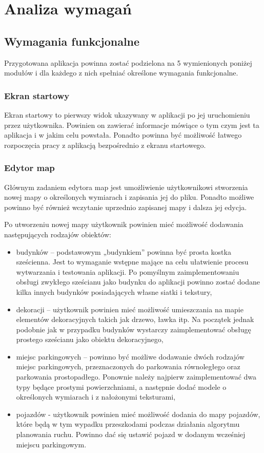 \documentclass[a4paper,11pt,twoside]{report}
\theoremstyle{definition}
\begin{document}
\chapter{Analiza wymagań}

\section{Wymagania funkcjonalne}

Przygotowana aplikacja powinna zostać podzielona na 5 wymienionych poniżej modułów i dla każdego z nich spełniać określone wymagania funkcjonalne.

\subsection{Ekran startowy}

Ekran startowy to pierwszy widok ukazywany w aplikacji po jej uruchomieniu przez użytkownika. Powinien on zawierać informacje mówiące o tym czym jest ta aplikacja i w jakim celu powstała. Ponadto powinna być możliwość łatwego rozpoczęcia pracy z aplikacją bezpośrednio z ekranu startowego.

\subsection{Edytor map}

Głównym zadaniem edytora map jest umożliwienie użytkownikowi stworzenia nowej mapy o określonych wymiarach i zapisania jej do pliku. Ponadto możliwe powinno być również wczytanie uprzednio zapisanej mapy i dalsza jej edycja.

Po utworzeniu nowej mapy użytkownik powinien mieć możliwość dodawania następujących rodzajów obiektów:
\begin{itemize}
	\item budynków – podstawowym „budynkiem” powinna być prosta kostka sześcienna. Jest to wymaganie wstępne mające na celu ułatwienie procesu wytwarzania i testowania aplikacji. Po pomyślnym zaimplementowaniu obsługi zwykłego sześcianu jako budynku do aplikacji powinno zostać dodane kilka innych budynków posiadających własne siatki i tekstury,
	\item dekoracji – użytkownik powinien mieć możliwość umieszczania na mapie elementów dekoracyjnych takich jak drzewo, ławka itp. Na początek jednak podobnie jak w przypadku budynków wystarczy zaimplementować obsługę prostego sześcianu jako obiektu dekoracyjnego,
	\item miejsc parkingowych – powinno być możliwe dodawanie dwóch rodzajów miejsc parkingowych, przeznaczonych do parkowania równoległego oraz parkowania prostopadłego. Ponownie należy najpierw zaimplementować dwa typy będące prostymi powierzchniami, a następnie dodać modele o określonych wymiarach i z nałożonymi teksturami,
	\item pojazdów - użytkownik powinien mieć możliwość dodania do mapy pojazdów, które będą w tym wypadku przeszkodami podczas działania algorytmu planowania ruchu. Powinno dać się ustawić pojazd w dodanym wcześniej miejscu parkingowym.
\end{itemize}
\end{document}
